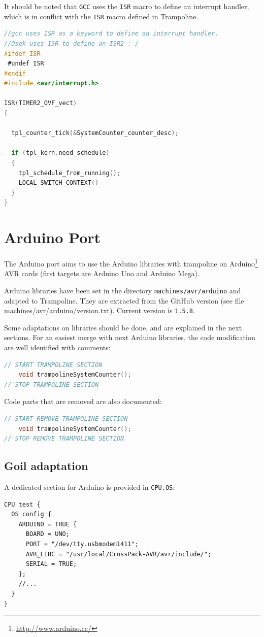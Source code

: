 It should be noted that \texttt{GCC} uses the \texttt{ISR} macro to define an interrupt handler, which is in conflict with the \texttt{ISR} macro defined in Trampoline.

\begin{lstlisting}[language=C]
//gcc uses ISR as a keyword to define an interrupt handler.
//Osek uses ISR to define an ISR2 :-/
#ifdef ISR
 #undef ISR
#endif
#include <avr/interrupt.h>

ISR(TIMER2_OVF_vect)
{

  tpl_counter_tick(&SystemCounter_counter_desc);

  if (tpl_kern.need_schedule)
  {
    tpl_schedule_from_running();
    LOCAL_SWITCH_CONTEXT()
  }
}	
\end{lstlisting}

\section{Arduino Port}
The Arduino port aims to use the Arduino libraries with trampoline on Arduino\footnote{\url{http://www.arduino.cc/}} AVR cards (first targets are Arduino Uno and Arduino Mega).

Arduino libraries have been set in the directory \texttt{machines/avr/arduino} and adapted to Trampoline. They are extracted from the GitHub version (see file machines/avr/arduino/version.txt). Current version is \texttt{1.5.8}.

Some adaptations on libraries should be done, and are explained in the next sections. For an easiest merge with next Arduino libraries, the code modification are well identified with comments:

\begin{lstlisting}[language=C]
// START TRAMPOLINE SECTION 
	void trampolineSystemCounter();
// STOP TRAMPOLINE SECTION 
\end{lstlisting}

Code parts that are removed are also documented:
\begin{lstlisting}[language=C]
// START REMOVE TRAMPOLINE SECTION
	void trampolineSystemCounter();
// STOP REMOVE TRAMPOLINE SECTION
\end{lstlisting}


\subsection{Goil adaptation}
A dedicated section for Arduino is provided in  \texttt{CPU.OS}:
\begin{lstlisting}[language=OIL]
CPU test {    
  OS config {
    ARDUINO = TRUE {
      BOARD = UNO;
      PORT = "/dev/tty.usbmodem1411";
      AVR_LIBC = "/usr/local/CrossPack-AVR/avr/include/";
      SERIAL = TRUE;
    };
    //...
  }
}
\end{lstlisting}

